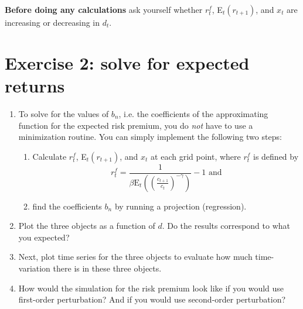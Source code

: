 \documentclass{article}
\begin{document}
\textbf{Before doing any calculations} ask yourself whether $r_{t}^{f}$, E$%
_{t}\left( r_{t+1}\right) $, and $x_{t}$ are increasing or decreasing in $%
d_{t}$.

\section{Exercise 2: solve for expected returns}

\begin{enumerate}
\item To solve for the values of $b_{n}$, i.e. the coefficients of the
approximating function for the expected risk premium, you do \emph{not} have
to use a minimization routine. You can simply implement the following two
steps:

\begin{enumerate}
\item Calculate $r_{t}^{f}$, E$_{t}\left( r_{t+1}\right) $, and $x_{t}$ at
each grid point, where $r_{t}^{f}$ is defined by%
\begin{equation*}
r_{t}^{f}=\frac{1}{\beta \text{E}_{t}\left( \left( \frac{c_{t+1}}{c_{t}}%
\right) ^{-\gamma }\right) }-1\text{ and}
\end{equation*}

\item find the coefficients $b_{n}$ by running a projection (regression).
\end{enumerate}

\item Plot the three objects as a function of $d$. Do the results correspond
to what you expected?

\item Next, plot time series for the three objects to evaluate how much
time-variation there is in these three objects.

\item How would the simulation for the risk premium look like if you would
use first-order perturbation? And if you would use second-order perturbation?
\end{enumerate}
\end{document}
